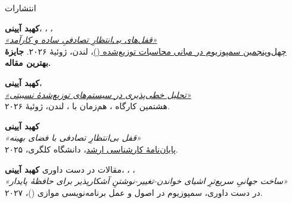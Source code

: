 \documentclass[11pt]{article}
\begin{document}
\begin{faSection}{انتشارات}

\textbf{کهبد آیینی}، ، ، \\
\href{https://dl.acm.org/doi/10.1145/3796701.3815952}{\textit{«قفل‌های بی‌انتظارِ تصادفیِ ساده و کارآمد»}}\\
\href{https://www.podc.org/podc2026/}{چهل‌وپنجمین سمپوزیوم  در مبانی محاسبات توزیع‌شده ()}، لندن، ژوئیۀ ۲۰۲۶. \textbf{جایزۀ بهترین مقاله.}

\vspace{0.5em}
\textbf{کهبد آیینی}، \\
\href{https://dl.acm.org/doi/10.1145/3820355.3820388}{\textit{«تحلیل خطی‌پذیری در سیستم‌های توزیع‌شدۀ نسبیتی»}}\\
هشتمین کارگاه ، هم‌زمان با ، لندن، ژوئیۀ ۲۰۲۶.

\vspace{0.5em}
\textbf{کهبد آیینی}\\
\textit{«قفل بی‌انتظارِ تصادفی با فضای بهینه»}\\
\href{https://ucalgary.scholaris.ca/bitstreams/5ae5cf8f-5009-4db3-b91e-d3dbb679b5bf/download}{پایان‌نامۀ کارشناسی ارشد}، دانشگاه کلگری، ۲۰۲۵.

\end{faSection}

\begin{faSection}{مقالات در دست داوری}
\textbf{کهبد آیینی}، ، ، \\
\textit{«ساخت جهانیِ سریع‌ترِ اشیای خواندن-تغییر-نوشتنِ آشکارپذیر برای حافظۀ پایدار»}\\
در دست داوری، سمپوزیوم  در اصول و عمل برنامه‌نویسی موازی ()، ۲۰۲۷.
\end{faSection}
\end{document}
